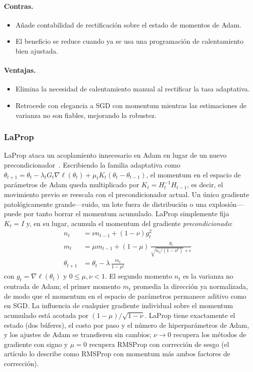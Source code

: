 \paragraph{Contras.}
\begin{itemize}[leftmargin=*]
\item Añade contabilidad de rectificación sobre el estado de momentos de Adam.
\item El beneficio se reduce cuando ya se usa una programación de calentamiento bien ajustada.
\end{itemize}

\paragraph{Ventajas.}
\begin{itemize}[leftmargin=*]
\item Elimina la necesidad de calentamiento manual al rectificar la tasa adaptativa.
\item Retrocede con elegancia a SGD con momentum mientras las estimaciones de varianza no son fiables, mejorando la robustez.
\end{itemize}


\subsubsection{LaProp}
LaProp ataca un acoplamiento innecesario en Adam en lugar de un nuevo
precondicionador~\citep{ziyin_laprop_2021}. Escribiendo la familia adaptativa
como $\theta_{t+1} = \theta_t - \lambda_t G_t \nabla\ell(\theta_t) + \mu_t K_t(\theta_t - \theta_{t-1})$,
el momentum en el espacio de parámetros de Adam queda multiplicado por
$K_t = H_t^{-1}H_{t-1}$, es decir, el movimiento previo se reescala con el
precondicionador actual. Un único gradiente patológicamente grande---ruido, un
lote fuera de distribución o una explosión---puede por tanto borrar el momentum
acumulado. LaProp simplemente fija $K_t = I$ y, en su lugar, acumula el momentum
del gradiente \emph{precondicionado}:
\begin{align}
n_t &= \nu n_{t-1} + (1-\nu) g_t^2 \\
m_t &= \mu m_{t-1} + (1-\mu)\,\frac{g_t}{\sqrt{n_t/(1-\nu^t)} + \epsilon} \\
\theta_{t+1} &= \theta_t - \lambda\,\frac{m_t}{1-\mu^t}
\end{align}
con $g_t = \nabla\ell(\theta_t)$ y $0 \le \mu, \nu < 1$. El segundo momento
$n_t$ es la varianza no centrada de Adam; el primer momento $m_t$ promedia la
dirección ya normalizada, de modo que el momentum en el espacio de parámetros
permanece aditivo como en SGD. La influencia de cualquier gradiente individual
sobre el momentum acumulado está acotada por $(1-\mu)/\sqrt{1-\nu}$. LaProp
tiene exactamente el estado (dos búferes), el costo por paso y el número de
hiperparámetros de Adam, y los ajustes de Adam se transfieren sin cambios;
$\nu \to 0$ recupera los métodos de gradiente con signo y $\mu = 0$ recupera
RMSProp con corrección de sesgo (el artículo lo describe como RMSProp con
momentum más ambos factores de corrección).

